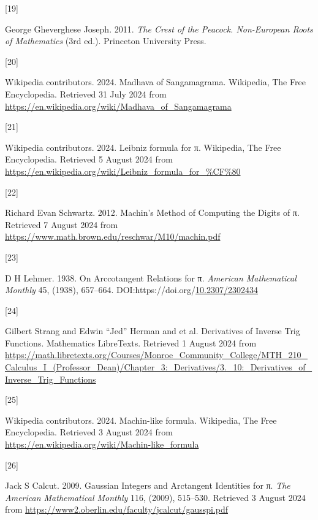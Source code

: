 \documentclass[
  a4paper,
]{article}
\newlength{\cslhangindent}
\newlength{\csllabelwidth}
\newenvironment{CSLReferences}[2] %
 {\begin{list}{}{%
  \setlength{\itemindent}{0pt}
  \setlength{\leftmargin}{0pt}
  \setlength{\parsep}{0pt}
  \ifodd #1
   \setlength{\leftmargin}{\cslhangindent}
   \setlength{\itemindent}{-1\cslhangindent}
  \fi
  \setlength{\itemsep}{#2\baselineskip}}}
 {\end{list}}
\newcommand{\CSLLeftMargin}[1]{\parbox[t]{\csllabelwidth}{\strut#1\strut}}
\newcommand{\CSLRightInline}[1]{\parbox[t]{\linewidth - \csllabelwidth}{\strut#1\strut}}
\begin{document}
\begin{CSLReferences}{0}{0}
\CSLLeftMargin{{[}19{]} }%
\CSLRightInline{George Gheverghese Joseph. 2011. \emph{{The Crest of the
Peacock}. {Non-European Roots of Mathematics}} (3rd ed.). Princeton
University Press.}

\CSLLeftMargin{{[}20{]} }%
\CSLRightInline{Wikipedia contributors. 2024. {Madhava of Sangamagrama}.
{Wikipedia, The Free Encyclopedia}. Retrieved 31 July 2024 from
\url{https://en.wikipedia.org/wiki/Madhava_of_Sangamagrama}}

\CSLLeftMargin{{[}21{]} }%
\CSLRightInline{Wikipedia contributors. 2024. {Leibniz formula for π}.
{Wikipedia, The Free Encyclopedia}. Retrieved 5 August 2024 from
\url{https://en.wikipedia.org/wiki/Leibniz_formula_for_\%CF\%80}}

\CSLLeftMargin{{[}22{]} }%
\CSLRightInline{Richard Evan Schwartz. 2012. {Machin's Method of
Computing the Digits of π}. Retrieved 7 August 2024 from
\url{https://www.math.brown.edu/reschwar/M10/machin.pdf}}

\CSLLeftMargin{{[}23{]} }%
\CSLRightInline{D H Lehmer. 1938. {On Arccotangent Relations for π}.
\emph{American Mathematical Monthly} 45, (1938), 657--664.
DOI:https://doi.org/\href{https://doi.org/10.2307/2302434}{10.2307/2302434}}

\CSLLeftMargin{{[}24{]} }%
\CSLRightInline{Gilbert Strang and Edwin ``Jed'' Herman and et al.
{Derivatives of Inverse Trig Functions}. Mathematics LibreTexts.
Retrieved 1 August 2024 from
\url{https://math.libretexts.org/Courses/Monroe_Community_College/MTH_210_Calculus_I_(Professor_Dean)/Chapter_3:_Derivatives/3._10:_Derivatives_of_Inverse_Trig_Functions}}

\CSLLeftMargin{{[}25{]} }%
\CSLRightInline{Wikipedia contributors. 2024. {Machin-like formula}.
{Wikipedia, The Free Encyclopedia}. Retrieved 3 August 2024 from
\url{https://en.wikipedia.org/wiki/Machin-like_formula}}

\CSLLeftMargin{{[}26{]} }%
\CSLRightInline{Jack S Calcut. 2009. {Gaussian Integers and Arctangent
Identities for π}. \emph{{The American Mathematical Monthly}} 116,
(2009), 515--530. Retrieved 3 August 2024 from
\url{https://www2.oberlin.edu/faculty/jcalcut/gausspi.pdf}}


\end{CSLReferences}
\end{document}
